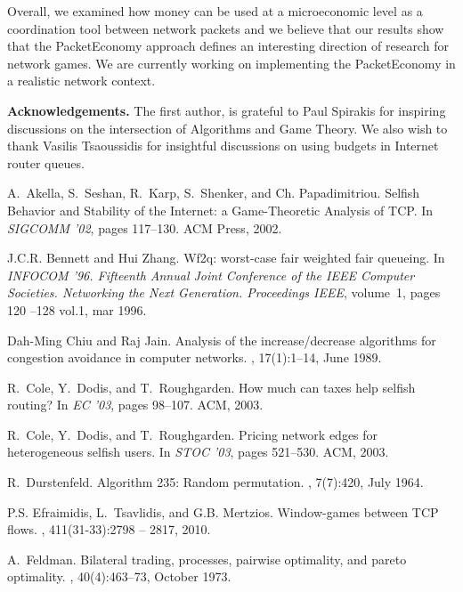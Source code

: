 \documentclass[letterpaper,10pt]{llncs}
\begin{document}
Overall, we examined how money can be used at a microeconomic level 
as a coordination tool between network packets and we believe that 
our results show that the PacketEconomy approach defines an 
interesting direction of research for network games. We 
are currently working on implementing the PacketEconomy in a 
realistic network context.

\vspace{0.2cm}
\noindent
{\bf Acknowledgements.}
The first author, is grateful to Paul Spirakis for inspiring discussions on
the intersection of Algorithms and Game Theory. We also wish to thank Vasilis Tsaoussidis
for insightful discussions on using budgets in Internet router queues.

\begin{thebibliography}{1}

A.~Akella, S.~Seshan, R.~Karp, S.~Shenker, and Ch. Papadimitriou.
\newblock Selfish {Behavior} and {Stability} of the {Internet}: a
  {Game}-{Theoretic} {Analysis} of {TCP}.
\newblock In {\em SIGCOMM '02}, pages 117--130. ACM Press, 2002.

J.C.R. Bennett and Hui Zhang.
\newblock Wf2q: worst-case fair weighted fair queueing.
\newblock In {\em INFOCOM '96. Fifteenth Annual Joint Conference of the IEEE
  Computer Societies. Networking the Next Generation. Proceedings IEEE},
  volume~1, pages 120 --128 vol.1, mar 1996.

Dah-Ming Chiu and Raj Jain.
\newblock Analysis of the increase\slash decrease algorithms for congestion
  avoidance in computer networks.
, 17(1):1--14, June 1989.

R.~Cole, Y.~Dodis, and T.~Roughgarden.
\newblock How much can taxes help selfish routing?
\newblock In {\em EC '03}, pages 98--107. ACM, 2003.

R.~Cole, Y.~Dodis, and T.~Roughgarden.
\newblock Pricing network edges for heterogeneous selfish users.
\newblock In {\em STOC '03}, pages 521--530. ACM, 2003.

R.~Durstenfeld.
\newblock Algorithm 235: Random permutation.
, 7(7):420, July 1964.

P.S. Efraimidis, L.~Tsavlidis, and G.B. Mertzios.
\newblock Window-games between {TCP} flows.
, 411(31-33):2798 -- 2817, 2010.

A.~Feldman.
\newblock Bilateral trading, processes, pairwise optimality, and pareto
  optimality.
, 40(4):463--73, October 1973.


\end{thebibliography}
\end{document}
